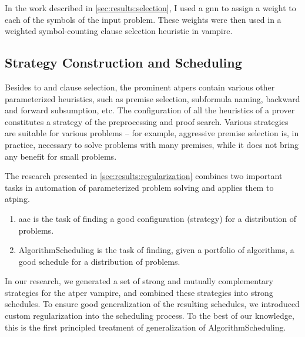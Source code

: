 In the work described in \cref{sec:results:selection},
I used a \gls{gnn} to assign a weight to each of the symbols of the input problem.
These weights were then used in a weighted symbol-counting clause selection heuristic in \gls{vampire}.

\subsection{Strategy Construction and Scheduling}

Besides \gls{to} and clause selection, the prominent \glspl{atper} contain various other parameterized heuristics,
such as premise selection, subformula naming, backward and forward subsumption, etc.
The configuration of all the heuristics of a prover constitutes a strategy of the preprocessing and proof search.
Various strategies are suitable for various problems -- for example, aggressive premise selection is, in practice, necessary to solve problems with many premises, while it does not bring any benefit for small problems.

The research presented in \cref{sec:results:regularization} combines two important tasks in automation of parameterized problem solving and applies them to \gls{atping}.
\begin{enumerate}
\item \Gls{aac} is the task of finding a good configuration (strategy) for a distribution of problems.
\item \Gls{AlgorithmScheduling} is the task of finding, given a portfolio of algorithms, a good schedule for a distribution of problems.
\end{enumerate}
In our research, we generated a set of strong and mutually complementary strategies for the \gls{atper} \gls{vampire},
and combined these strategies into strong schedules.
To ensure good generalization of the resulting schedules, we introduced custom regularization into the scheduling process.
To the best of our knowledge, this is the first principled treatment of generalization of \gls{AlgorithmScheduling}.
